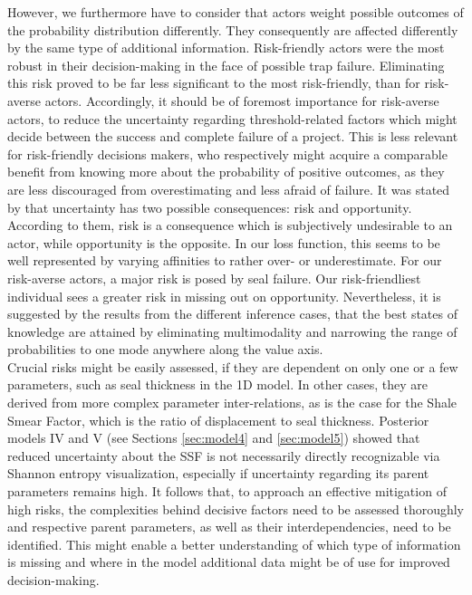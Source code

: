 	However, we furthermore have to consider that actors weight possible outcomes of the probability distribution differently. They consequently are affected differently by the same type of additional information. Risk-friendly actors were the most robust in their decision-making in the face of possible trap failure. Eliminating this risk proved to be far less significant to the most risk-friendly, than for risk-averse actors. Accordingly, it should be of foremost importance for risk-averse actors, to reduce the uncertainty regarding threshold-related factors which might decide between the success and complete failure of a project. This is less relevant for risk-friendly decisions makers, who respectively might acquire a comparable benefit from knowing more about the probability of positive outcomes, as they are less discouraged from overestimating and less afraid of failure. It was stated by \citet{bratvold2010making} that uncertainty has two possible consequences: risk and opportunity. According to them, risk is a consequence which is subjectively undesirable to an actor, while opportunity is the opposite. In our loss function, this seems to be well represented by varying affinities to rather over- or underestimate. For our risk-averse actors, a major risk is posed by seal failure. Our risk-friendliest individual sees a greater risk in missing out on opportunity. Nevertheless, it is suggested by the results from the different inference cases, that the best states of knowledge are attained by eliminating multimodality and narrowing the range of probabilities to one mode anywhere along the value axis.\\
	Crucial risks might be easily assessed, if they are dependent on only one or a few parameters, such as seal thickness in the 1D model. In other cases, they are derived from more complex parameter inter-relations, as is the case for the Shale Smear Factor, which is the ratio of displacement to seal thickness. Posterior models IV and V (see Sections \ref{sec:model4} and \ref{sec:model5}) showed that reduced uncertainty about the SSF is not necessarily directly recognizable via Shannon entropy visualization, especially if uncertainty regarding its parent parameters remains high. It follows that, to approach an effective mitigation of high risks, the complexities behind decisive factors need to be assessed thoroughly and respective parent parameters, as well as their interdependencies, need to be identified. This might enable a better understanding of which type of information is missing and where in the model additional data might be of use for improved decision-making.\\	

